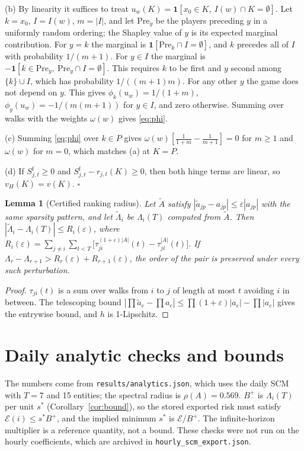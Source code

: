 \documentclass[referee,pdflatex,sn-mathphys-ay]{sn-jnl}
\theoremstyle{thmstyleone}%
\newtheorem{lemma}{Lemma}%
\theoremstyle{thmstyletwo}%
\theoremstyle{thmstylethree}%
\begin{document}
\begin{appendices}
(b) By linearity it suffices to treat $u_w(K)=\mathbf 1[x_0\in K,\ I(w)\cap K=\emptyset]$. Let
$k=x_0$, $I=I(w)$, $m=|I|$, and let $\mathrm{Pre}_y$ be the players preceding $y$ in a uniformly
random ordering; the Shapley value of $y$ is its expected marginal contribution. For $y=k$ the
marginal is $\mathbf 1[\mathrm{Pre}_k\cap I=\emptyset]$, and $k$ precedes all of $I$ with
probability $1/(m+1)$. For $y\in I$ the marginal is $-\mathbf 1[k\in\mathrm{Pre}_y,\ \mathrm{Pre}_y\cap I=\emptyset]$.
This requires $k$ to be first and $y$ second among $\{k\}\cup I$, which has probability
$1/((m+1)m)$. For any other $y$ the game does not depend on $y$. This gives
$\phi_k(u_w)=1/(1+m)$, $\phi_y(u_w)=-1/(m(m+1))$ for $y\in I$, and zero otherwise. Summing
over walks with the weights $\omega(w)$ gives \eqref{eq:phi}.

(c) Summing \eqref{eq:phi} over $k\in P$ gives $\omega(w)[\tfrac1{1+m}-\tfrac1{m+1}]=0$ for $m\ge1$ and $\omega(w)$ for $m=0$, which matches (a) at $K=P$.

(d) If $S^{\mathrm f}_{j,t}\ge0$ and $S^{\mathrm f}_{j,t}-r_{j,t}(K)\ge0$, then both hinge terms are linear, so
$v_H(K)=v(K)$. \hfill$\square$

\begin{lemma}[Certified ranking radius]
\label{lem:radius}
Let $\tilde A$ satisfy $|\tilde a_{jp}-a_{jp}|\le\varepsilon|a_{jp}|$ with the same sparsity
pattern, and let $\tilde\Lambda_i$ be $\Lambda_i(T)$ computed from $\tilde A$. Then
$|\tilde\Lambda_i-\Lambda_i(T)|\le R_i(\varepsilon)$, where
$R_i(\varepsilon)=\sum_{j\ne i}\sum_{t<T}\big[\tau^{(1+\varepsilon)|A|}_{ji}(t)-\tau^{|A|}_{ji}(t)\big]$.
If $\Lambda_r-\Lambda_{r+1}>R_r(\varepsilon)+R_{r+1}(\varepsilon)$, the order of the pair is
preserved under every such perturbation.
\end{lemma}
\begin{proof}
$\tau_{ji}(t)$ is a sum over walks from $i$ to $j$ of length at most $t$ avoiding $i$ in between. The telescoping bound $|\prod\tilde a_e-\prod a_e|\le\prod(1+\varepsilon)|a_e|-\prod|a_e|$ gives the entrywise bound, and $h$ is 1-Lipschitz.
\end{proof}

\section{Daily analytic checks and bounds}\label{app:bounds}

The numbers come from \texttt{results/analytics.json}, which uses the daily SCM with $T=7$ and 15 entities; the
spectral radius is $\rho(A)=0.569$. $B^+$ is $\Lambda_i(T)$ per unit $s^\ast$ (Corollary~\ref{cor:bound}), so the stored
exported risk must satisfy $\mathcal{E}(i)\le s^\ast B^+$, and the implied minimum $s^\ast$ is $\mathcal{E}/B^+$. The
infinite-horizon multiplier is a reference quantity, not a bound. These checks were not
run on the hourly coefficients, which are archived in \texttt{hourly\_scm\_export.json}.


\end{appendices}
\end{document}
